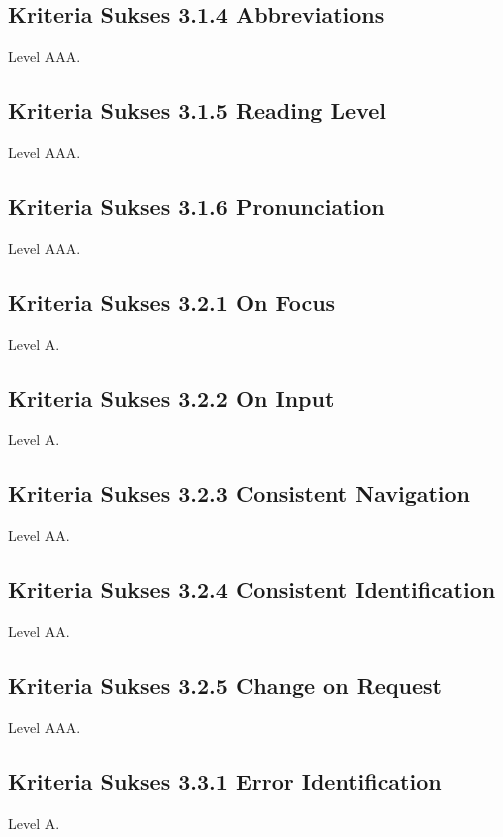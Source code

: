 \subsection{Kriteria Sukses 3.1.4 Abbreviations}
\label{sec:kriteria_3.1.4}
Level AAA.

\subsection{Kriteria Sukses 3.1.5 Reading Level}
\label{sec:kriteria_3.1.5}
Level AAA.

\subsection{Kriteria Sukses 3.1.6 Pronunciation}
\label{sec:kriteria_3.1.6}
Level AAA.

\subsection{Kriteria Sukses 3.2.1 On Focus}
\label{sec:kriteria_3.2.1}
Level A.

\subsection{Kriteria Sukses 3.2.2 On Input}
\label{sec:kriteria_3.2.2}
Level A.

\subsection{Kriteria Sukses 3.2.3 Consistent Navigation}
\label{sec:kriteria_3.2.3}
Level AA.

\subsection{Kriteria Sukses 3.2.4 Consistent Identification}
\label{sec:kriteria_3.2.4}
Level AA.

\subsection{Kriteria Sukses 3.2.5 Change on Request}
\label{sec:kriteria_3.2.5}
Level AAA.

\subsection{Kriteria Sukses 3.3.1 Error Identification}
\label{sec:kriteria_3.3.1}
Level A.

